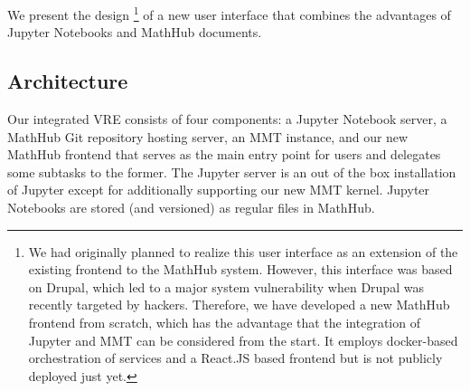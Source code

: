 We present the design%
\footnote{We had originally planned to realize this user interface as an extension of the existing frontend to the MathHub system.
However, this interface was based on Drupal, which led to a major system vulnerability when Drupal was recently targeted by hackers.
Therefore, we have developed a new MathHub frontend from scratch, which has the advantage that the integration of Jupyter and MMT can be considered from the start.
It employs docker-based orchestration of services and a React.JS based frontend but is not publicly deployed just yet.}
of a new user interface that combines the advantages of Jupyter Notebooks and MathHub documents.

\subsection{Architecture}

Our integrated VRE consists of four components: a Jupyter Notebook server, a MathHub Git repository hosting server, an MMT instance, and our new MathHub frontend that serves as the main entry point for users and delegates some subtasks to the former.
The Jupyter server is an out of the box installation of Jupyter except for additionally supporting our new MMT kernel.
Jupyter Notebooks are stored (and versioned) as regular files in MathHub.

